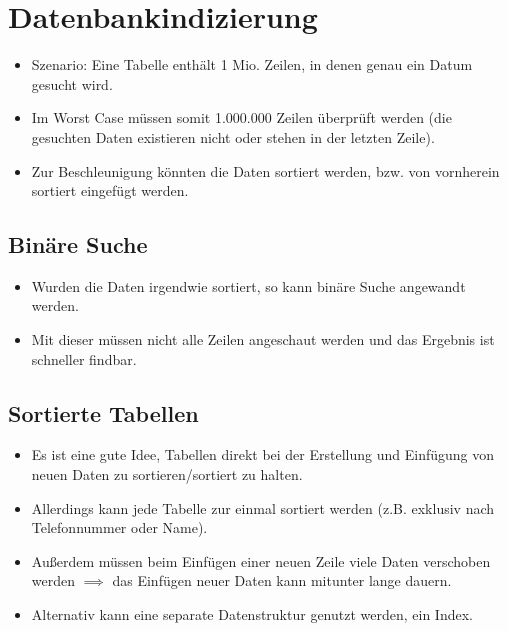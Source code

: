     \section{Datenbankindizierung} %
        \begin{itemize}
        	\item Szenario: Eine Tabelle enthält 1 Mio. Zeilen, in denen genau ein Datum gesucht wird.
        	\item Im Worst Case müssen somit 1.000.000 Zeilen überprüft werden (die gesuchten Daten existieren nicht oder stehen in der letzten Zeile).
        	\item Zur Beschleunigung könnten die Daten sortiert werden, bzw. von vornherein sortiert eingefügt werden.
        \end{itemize}

        \subsection{Binäre Suche} %
            \begin{itemize}
            	\item Wurden die Daten irgendwie sortiert, so kann binäre Suche angewandt werden.
            	\item Mit dieser müssen nicht alle Zeilen angeschaut werden und das Ergebnis ist schneller findbar.
            \end{itemize}

        \subsection{Sortierte Tabellen} %
            \begin{itemize}
            	\item Es ist eine gute Idee, Tabellen direkt bei der Erstellung und Einfügung von neuen Daten zu sortieren/sortiert zu halten.
            	\item Allerdings kann jede Tabelle zur einmal sortiert werden (z.B. exklusiv nach Telefonnummer oder Name).
            	\item Außerdem müssen beim Einfügen einer neuen Zeile viele Daten verschoben werden \( \implies \) das Einfügen neuer Daten kann mitunter lange dauern.
            	\item Alternativ kann eine separate Datenstruktur genutzt werden, ein Index.
            \end{itemize}

